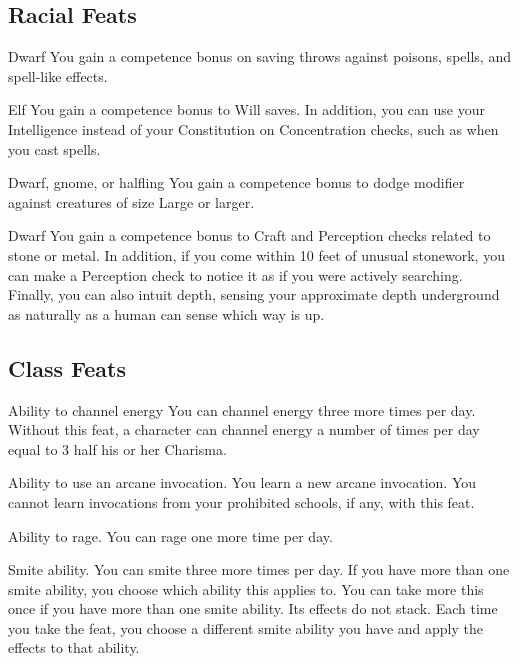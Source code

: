 \subsection{Racial Feats}

 Dwarf
 You gain a  competence bonus on saving throws against poisons, spells, and spell-like effects.

 Elf
 You gain a  competence bonus to Will saves. In addition, you can use your Intelligence instead of your Constitution on Concentration checks, such as when you cast spells.

 Dwarf, gnome, or halfling
 You gain a  competence bonus to dodge modifier against creatures of size Large or larger.

 Dwarf
 You gain a  competence bonus to Craft and Perception checks related to stone or metal. In addition, if you come within 10 feet of unusual stonework, you can make a Perception check to notice it as if you were actively searching. Finally, you can also intuit depth, sensing your approximate depth underground as naturally as a human can sense which way is up.

\subsection{Class Feats}

 Ability to channel energy
 You can channel energy three more times per day. 
 Without this feat, a character can channel energy a number of times per day equal to 3 \add half his or her Charisma.

 Ability to use an arcane invocation.
 You learn a new arcane invocation. You cannot learn invocations from your prohibited schools, if any, with this feat.

 Ability to rage.
 You can rage one more time per day.

 Smite ability.
 You can smite three more times per day. If you have more than one smite ability, you choose which ability this applies to.
 You can take more this once if you have more than one smite ability. Its effects do not stack. Each time you take the feat, you choose a different smite ability you have and apply the effects to that ability.

